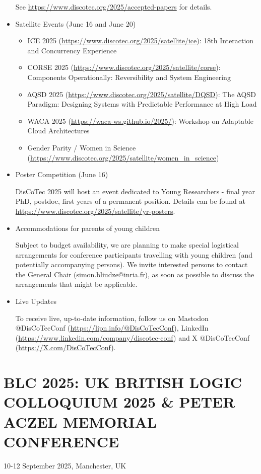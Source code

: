 \documentclass[prodmode,acmtecs]{acmsmall} %
\begin{document}
\begin{itemize}
  See \href{https://www.discotec.org/2025/accepted-papers}{https://www.discotec.org/2025/accepted-papers} for details. 
 
\item  Satellite Events (June 16 and June 20) 
 
\begin{itemize}\item  ICE 2025 (\href{https://www.discotec.org/2025/satellite/ice}{https://www.discotec.org/2025/satellite/ice}): 18th Interaction and Concurrency Experience
\item  CORSE 2025 (\href{https://www.discotec.org/2025/satellite/corse}{https://www.discotec.org/2025/satellite/corse}): Components Operationally: Reversibility and System Engineering
\item  ∆QSD 2025 (\href{https://www.discotec.org/2025/satellite/DQSD}{https://www.discotec.org/2025/satellite/DQSD}): The ∆QSD Paradigm: Designing Systems with Predictable Performance at High Load
\item  WACA 2025 (\href{https://waca-ws.github.io/2025/}{https://waca-ws.github.io/2025/}): Workshop on Adaptable Cloud Architectures
\item  Gender Parity / Women in Science (\href{https://www.discotec.org/2025/satellite/women_in_science}{https://www.discotec.org/2025/satellite/women\_in\_science})
\end{itemize} 
\item  Poster Competition (June 16) 
 
  DisCoTec 2025 will host an event dedicated to Young Researchers - final year PhD, postdoc, first years of a permanent position. Details can be found at \href{https://www.discotec.org/2025/satellite/yr-posters}{https://www.discotec.org/2025/satellite/yr-posters}. 
 
\item  Accommodations for parents of young children 
 
  Subject to budget availability, we are planning to make special logistical arrangements for conference participants travelling with young children (and potentially accompanying persons). We invite interested persons to contact the General Chair (simon.bliudze@inria.fr), as soon as possible to discuss the arrangements that might be applicable. 
 
\item  Live Updates 
 
  To receive live, up-to-date information, follow us on Mastodon @DisCoTecConf (\href{https://lipn.info/@DisCoTecConf}{https://lipn.info/@DisCoTecConf}), LinkedIn (\href{https://www.linkedin.com/company/discotec-conf}{https://www.linkedin.com/company/discotec-conf}) and X @DisCoTecConf (\href{https://X.com/DisCoTecConf}{https://X.com/DisCoTecConf}). 
 
\end{itemize}\section{BLC 2025: UK BRITISH LOGIC COLLOQUIUM 2025 \& PETER ACZEL MEMORIAL CONFERENCE}\label{BLC2025}  10-12 September 2025, Manchester, UK\\ 
\end{document}
